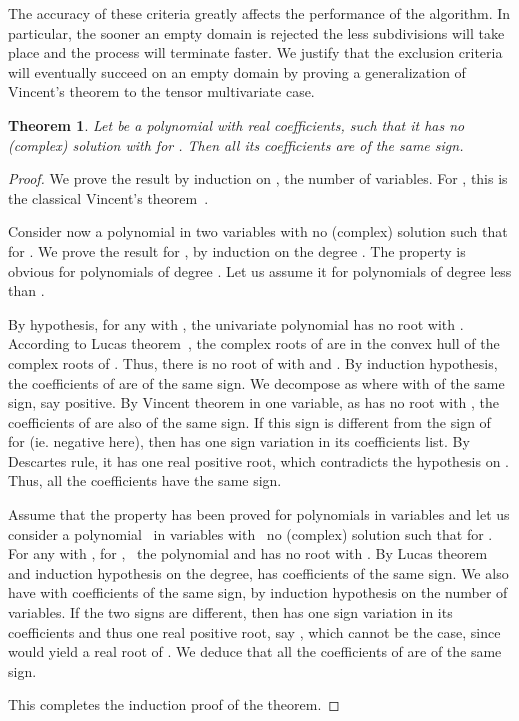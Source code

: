 \documentclass{sig-alternate}
\newtheorem{theorem}{Theorem}[section]
\begin{document}
The accuracy of these criteria greatly affects the performance of the
algorithm. In particular, the sooner an empty domain is rejected the
less subdivisions will take place and the process will terminate
faster. We justify that the exclusion criteria will eventually succeed
on an empty domain by proving a generalization of Vincent's theorem to
the tensor multivariate case.

\begin{theorem} \label{vincentxyz} Let  be a
  polynomial with real coefficients, such that it has no (complex)
  solution with  for . Then all its
  coefficients  are of the same sign.
\end{theorem}
\begin{proof}
  We prove the result by induction on , the number of
  variables. For , this is the classical Vincent's
  theorem~{\cite{Vincent}}.
  
  Consider now a polynomial 
   in two variables with no
  (complex) solution such that  for . We
  prove the result for , by induction on the degree . The property is obvious for polynomials of degree . Let
  us assume it for polynomials of degree less than .
  
  By hypothesis, for any  with ,
  the univariate polynomial  has no root with .  According to Lucas theorem~\cite{Marden1966}, the complex
  roots of  are in the convex hull of the
  complex roots of . Thus, there is no root of
   with  and . By induction hypothesis, the coefficients of
   are of the same sign. We decompose 
  as
   where  with  of the same sign, say
  positive. By Vincent theorem in one variable, as  has no
  root with , the coefficients  of  are also of the same sign. If this sign is different from
  the sign of  for  (ie. negative
  here), then  has one sign variation in its coefficients
  list. By Descartes rule, it has one real positive root, which
  contradicts the hypothesis on . Thus, all the coefficients have
  the same sign.
  
  Assume that the property has been proved for polynomials in 
  variables and let us consider a polynomial \  in  variables with \ no (complex) solution
  such that  for . For any  with , for , \ the polynomial 
  and  has no root
  with . By Lucas theorem and induction hypothesis on
  the degree,  has coefficients of the same
  sign. We also have  with coefficients
  of the same sign, by induction hypothesis on the number of
  variables. If the two signs are different, then  has one sign variation in its coefficients and thus one real
  positive root, say , which cannot be the case, since
   would yield a real root of . We deduce
  that all the coefficients of  are of the same sign.
  
  This completes the induction proof of the theorem.
\end{proof}
\end{document}
